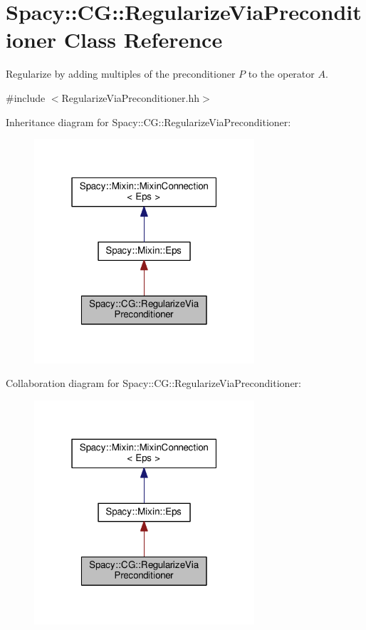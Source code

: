 \hypertarget{classSpacy_1_1CG_1_1RegularizeViaPreconditioner}{\section{Spacy\-:\-:C\-G\-:\-:Regularize\-Via\-Preconditioner Class Reference}
\label{classSpacy_1_1CG_1_1RegularizeViaPreconditioner}
}


Regularize by adding multiples of the preconditioner $P$ to the operator $A$.  




{\ttfamily \#include $<$Regularize\-Via\-Preconditioner.\-hh$>$}



Inheritance diagram for Spacy\-:\-:C\-G\-:\-:Regularize\-Via\-Preconditioner\-:
\nopagebreak
\begin{figure}[H]
\begin{center}
\leavevmode
\includegraphics[width=232pt]{classSpacy_1_1CG_1_1RegularizeViaPreconditioner__inherit__graph}
\end{center}
\end{figure}


Collaboration diagram for Spacy\-:\-:C\-G\-:\-:Regularize\-Via\-Preconditioner\-:
\nopagebreak
\begin{figure}[H]
\begin{center}
\leavevmode
\includegraphics[width=232pt]{classSpacy_1_1CG_1_1RegularizeViaPreconditioner__coll__graph}
\end{center}
\end{figure}

